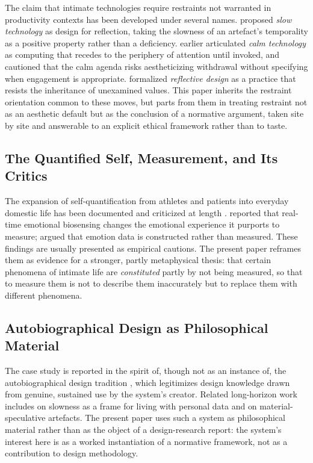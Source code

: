 The claim that intimate technologies require restraints not warranted in productivity contexts has been developed under several names. \textcite{hallnas2001slow} proposed \emph{slow technology} as design for reflection, taking the slowness of an artefact's temporality as a positive property rather than a deficiency. \textcite{weiser1996calm} earlier articulated \emph{calm technology} as computing that recedes to the periphery of attention until invoked, and \textcite{rogers2006moving} cautioned that the calm agenda risks aestheticizing withdrawal without specifying when engagement is appropriate. \textcite{sengers2005reflective} formalized \emph{reflective design} as a practice that resists the inheritance of unexamined values. This paper inherits the restraint orientation common to these moves, but parts from them in treating restraint not as an aesthetic default but as the conclusion of a normative argument, taken site by site and answerable to an explicit ethical framework rather than to taste.

\subsection{The Quantified Self, Measurement, and Its Critics}

The expansion of self-quantification from athletes and patients into everyday domestic life has been documented and criticized at length \parencite{lupton2016quantified}. \textcite{howell2018emotional} reported that real-time emotional biosensing changes the emotional experience it purports to measure; \textcite{boehner2007how} argued that emotion data is constructed rather than measured. These findings are usually presented as empirical cautions. The present paper reframes them as evidence for a stronger, partly metaphysical thesis: that certain phenomena of intimate life are \emph{constituted} partly by not being measured, so that to measure them is not to describe them inaccurately but to replace them with different phenomena.

\subsection{Autobiographical Design as Philosophical Material}

The case study is reported in the spirit of, though not as an instance of, the autobiographical design tradition \parencite{neustaedter2012autobiographical}, which legitimizes design knowledge drawn from genuine, sustained use by the system's creator. Related long-horizon work includes \textcite{odom2018slow} on slowness as a frame for living with personal data and \textcite{wakkary2017morse} on material-speculative artefacts. The present paper uses such a system as philosophical material rather than as the object of a design-research report: the system's interest here is as a worked instantiation of a normative framework, not as a contribution to design methodology.

